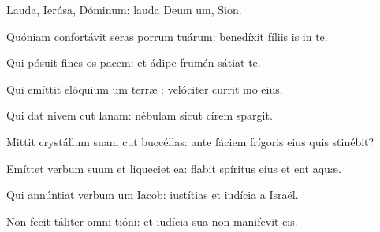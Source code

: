 \item {}

\item Lauda, Ierúsa, Dóminum:\psstar{} lauda Deum um, Sion.

\item Quóniam confortávit seras porrum tuárum:\psstar{} benedíxit fíliis is in te.

\item Qui pósuit fines os pacem:\psstar{} et ádipe frumén sátiat te.

\item Qui emíttit elóquium um terræ :\psstar{} velóciter currit mo eius.

\item Qui dat nivem cut lanam:\psstar{} nébulam sicut círem spargit.

\item Mittit crystállum suam cut buccéllas:\psstar{} ante fáciem frígoris eius quis stinébit?

\item Emíttet verbum suum et liqueciet ea:\psstar{} flabit spíritus eius et ent aquæ.

\item Qui annúntiat verbum um Iacob:\psstar{} iustítias et iudícia a Israël.

\item Non fecit táliter omni tióni:\psstar{} et iudícia sua non manifevit eis.
